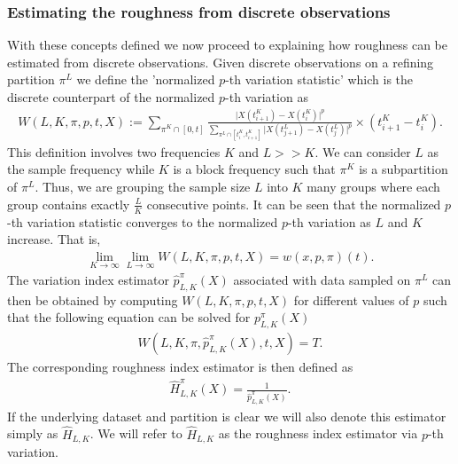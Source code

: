 \documentclass{article}
\begin{document}
\subsubsection{Estimating the roughness from discrete observations}
With these concepts defined we now proceed to explaining how roughness can be estimated from discrete observations. Given discrete observations on a refining partition $\pi^L$ we define the 'normalized $p$-th variation statistic' which is the discrete counterpart of the normalized $p$-th variation as
\begin{align}
W(L, K, \pi, p, t, X) := \sum_{\pi^K\cap [0,t] } \frac{\lvert X(t_{i+1}^K)-X(t_i^K)\rvert^p}{\sum_{\pi^L\cap [t_i^K, t_{i+1}^K]}\lvert X(t_{j+1}^L)-X(t_j^L)\rvert^p} \times (t_{i+1}^K-t_i^K). \label{eq:w_stat_def}
\end{align}
This definition involves two frequencies $K$ and $L>>K$. We can consider $L$ as the sample frequency while $K$ is a block frequency such that $\pi^K$ is a subpartition of $\pi^L$. Thus, we are grouping the sample size $L$ into $K$ many groups where each group contains exactly $\frac{L}{K}$ consecutive points. It can be seen that the normalized $p$-th variation statistic converges to the normalized $p$-th variation as $L$ and $K$ increase. That is,
\begin{align*}
\lim_{K\rightarrow\infty}\lim_{L\rightarrow\infty} W(L, K, \pi, p, t, X) = w(x, p, \pi)(t).
\end{align*}
The variation index estimator $\hat{p}^\pi_{L,K}(X)$ associated with data sampled on $\pi^L$ can then be obtained by computing $W(L, K, \pi, p, t, X)$ for different values of $p$ such that the following equation can be solved for $p^\pi_{L,K}(X)$
\begin{align}
W(L, K, \pi, \hat{p}^\pi_{L,K}(X), t, X) = T. \label{eq:wpth}
\end{align}
The corresponding roughness index estimator is then defined as
\begin{align*}
\hat{H}^\pi_{L,K}(X) = \frac{1}{\hat{p}^\pi_{L,K}(X)}.
\end{align*}
If the underlying dataset and partition is clear we will also denote this estimator simply as $\widehat{H}_{L,K}$. We will refer to $\widehat{H}_{L,K}$ as the roughness index estimator via $p$-th variation. 
\end{document}

